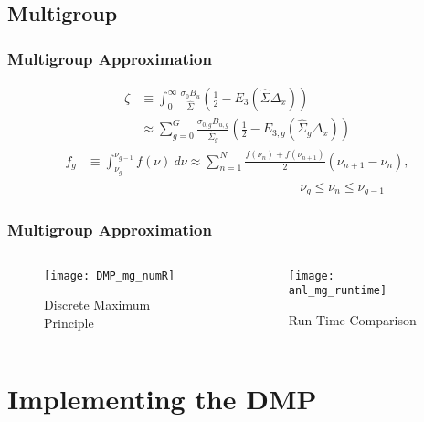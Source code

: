 \documentclass{beamer}
\begin{document}
\subsection{Multigroup}
\begin{frame}\frametitle{Multigroup Approximation}
\begin{exampleblock}{}
\begin{align*}
\zeta &\equiv\int_0^\infty\frac{\sigma_0 B_u}{\hat\Sigma}
  \left(\frac{1}{2}-E_3(\hat\Sigma\Delta_x)\right) \\
&\approx\sum_{g=0}^G \frac{\sigma_{0,g} B_{u,g}}{\hat\Sigma_g}
  \left(\frac{1}{2}-E_{3,g}(\hat\Sigma_g\Delta_x)\right)
\end{align*}
\begin{align*}
f_g&\equiv\int_{\nu_g}^{\nu_{g-1}} f(\nu)\ d\nu 
\approx\sum_{n=1}^N \frac{f(\nu_n)+f(\nu_{n+1})}{2}
  \left(\nu_{n+1}-\nu_n\right),\\
&\hspace{200pt}\nu_g\leq\nu_n\leq\nu_{g-1}
\end{align*}
\end{exampleblock}
\end{frame}

\begin{frame}\frametitle{Multigroup Approximation}
\begin{columns}
\begin{column}{.5\textwidth}
\begin{figure}
\texttt{[image: DMP\_mg\_numR]}
\caption{Discrete Maximum Principle}
\end{figure}
\end{column}
\begin{column}{.5\textwidth}
\begin{figure}
\texttt{[image: anl\_mg\_runtime]}
\caption{Run Time Comparison}
\end{figure}
\end{column}
\end{columns}
\end{frame}



\section{Implementing the DMP}
\end{document}

